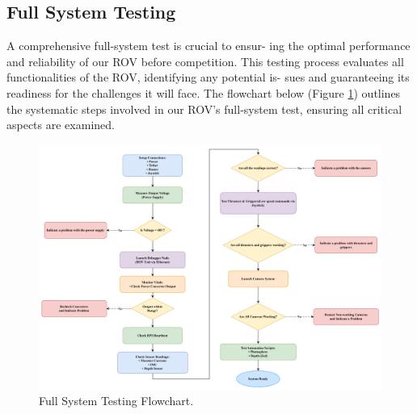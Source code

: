 \subsection{Full System Testing}

A comprehensive full-system test is crucial to ensur-
ing the optimal performance and reliability of our ROV before competition. This testing process evaluates all functionalities of the ROV, identifying any potential is-
sues and guaranteeing its readiness for the challenges it will face. The flowchart below (Figure \ref{fig:full_system_testing}) outlines the
systematic steps involved in our ROV’s full-system test,
ensuring all critical aspects are examined.

\begin{figure}[h]
    \centering
    \includegraphics[width=\columnwidth]{Sections/4Testing and Troubleshooting/images/full_system_testing.png}
    \caption{Full System Testing Flowchart.}
    \label{fig:full_system_testing}
\end{figure}